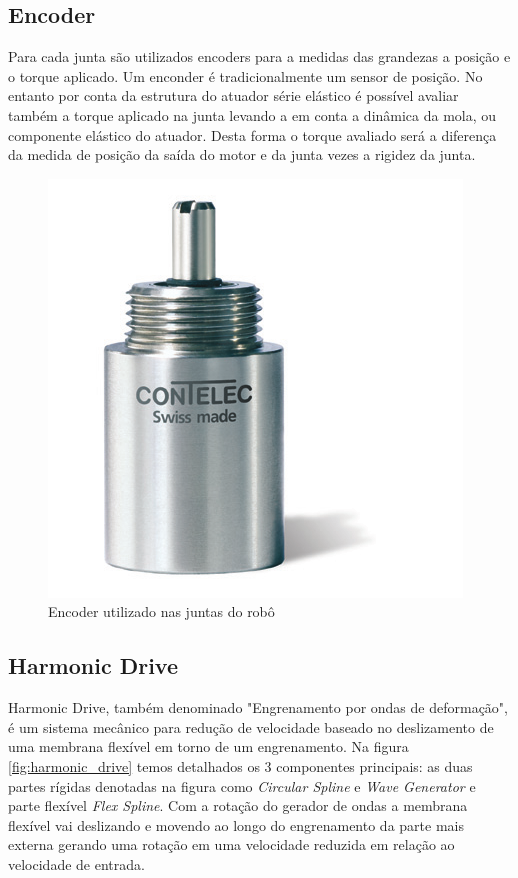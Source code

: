 

\subsection{Encoder}


Para cada junta são utilizados encoders para a medidas das grandezas a posição e o torque aplicado. Um enconder é tradicionalmente um sensor de posição. No entanto por conta da estrutura do atuador série elástico é possível avaliar também a torque aplicado na junta levando a em conta a dinâmica da mola, ou componente elástico do atuador. Desta forma o torque avaliado será a diferença da medida de posição da saída do motor e da junta vezes a rigidez da junta. 

\begin{figure}[H]
    \centering
    \includegraphics[width = 0.4\linewidth]{figs/vertX-encoder}
        \caption{Encoder utilizado nas juntas do robô}
    \label{fig:encoder}
\end{figure}

\subsection{Harmonic Drive}

Harmonic Drive, também denominado "Engrenamento por ondas de deformação", é um sistema mecânico para redução de velocidade baseado no deslizamento de uma membrana flexível em torno de um engrenamento. Na figura \ref{fig:harmonic_drive} temos detalhados os 3 componentes principais: as duas partes rígidas denotadas na figura como \textit{Circular Spline} e \textit{Wave Generator} e parte flexível \textit{Flex Spline}. Com a rotação do gerador de ondas a membrana flexível vai deslizando e movendo ao longo do engrenamento da parte mais externa gerando uma rotação em uma velocidade reduzida em relação ao velocidade de entrada.

